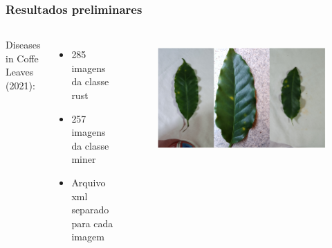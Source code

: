 \documentclass[aspectratio=169]{beamer}
\begin{document}
\begin{frame}
    \frametitle{Resultados preliminares}



    \begin{columns}




        Diseases in Coffe Leaves (2021):
        \begin{itemize}
            \item 285 imagens da classe rust
            \item 257 imagens da classe miner
            \item Arquivo xml separado para cada imagem
        \end{itemize}


        \begin{figure}
            \centering
            \includegraphics[scale = 0.3]{img/diseasescanvas.png}
            \label{fig:entelabel}
        \end{figure}


    \end{columns}

\end{frame}








\end{document}
